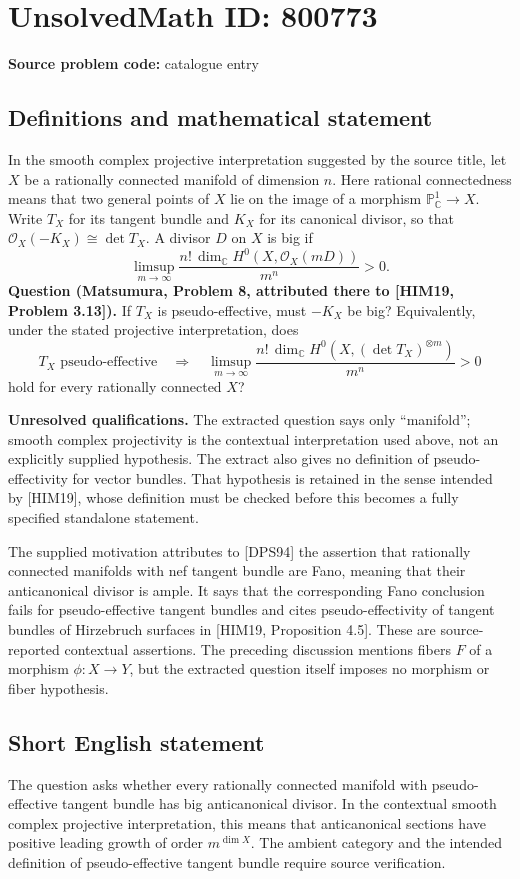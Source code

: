 \documentclass[11pt]{article}
\newcommand{\C}{\mathbb{C}}
\newcommand{\PP}{\mathbb{P}}
\begin{document}
\section*{UnsolvedMath ID: 800773}
\textbf{Source problem code:} catalogue entry
\subsection{Definitions and mathematical statement}
In the smooth complex projective interpretation suggested by the source title, let \(X\) be a rationally connected manifold of dimension \(n\). Here rational connectedness means that two general points of \(X\) lie on the image of a morphism \(\PP^1_{\C}\to X\). Write \(T_X\) for its tangent bundle and \(K_X\) for its canonical divisor, so that \(\mathcal O_X(-K_X)\cong\det T_X\). A divisor \(D\) on \(X\) is big if
\[
\limsup_{m\to\infty}\frac{n!\,\dim_{\C}H^0(X,\mathcal O_X(mD))}{m^n}>0.
\]
\textbf{Question (Matsumura, Problem 8, attributed there to [HIM19, Problem 3.13]).} If \(T_X\) is pseudo-effective, must \(-K_X\) be big? Equivalently, under the stated projective interpretation, does
\[
T_X\text{ pseudo-effective}
\quad\Longrightarrow\quad
\limsup_{m\to\infty}\frac{n!\,\dim_{\C}H^0(X,(\det T_X)^{\otimes m})}{m^n}>0
\]
hold for every rationally connected \(X\)?

\textbf{Unresolved qualifications.} The extracted question says only ``manifold''; smooth complex projectivity is the contextual interpretation used above, not an explicitly supplied hypothesis. The extract also gives no definition of pseudo-effectivity for vector bundles. That hypothesis is retained in the sense intended by [HIM19], whose definition must be checked before this becomes a fully specified standalone statement.

The supplied motivation attributes to [DPS94] the assertion that rationally connected manifolds with nef tangent bundle are Fano, meaning that their anticanonical divisor is ample. It says that the corresponding Fano conclusion fails for pseudo-effective tangent bundles and cites pseudo-effectivity of tangent bundles of Hirzebruch surfaces in [HIM19, Proposition 4.5]. These are source-reported contextual assertions. The preceding discussion mentions fibers \(F\) of a morphism \(\phi\colon X\to Y\), but the extracted question itself imposes no morphism or fiber hypothesis.
\subsection{Short English statement}
The question asks whether every rationally connected manifold with pseudo-effective tangent bundle has big anticanonical divisor. In the contextual smooth complex projective interpretation, this means that anticanonical sections have positive leading growth of order \(m^{\dim X}\). The ambient category and the intended definition of pseudo-effective tangent bundle require source verification.
\end{document}
